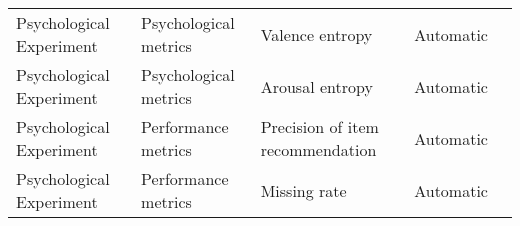 \begin{small}
\begin{center}
\begin{longtable}{@{}p{}p{}p{}p{}p{}@{}}
Psychological Experiment & Psychological metrics & Valence entropy                                                                                                                                                                                             & Automatic & \cite{lei2024fairmindsim}                                                                                                                                                                                                                                                                                                                                                                                                   \\
Psychological Experiment & Psychological metrics & Arousal entropy                                                                                                                                                                                             & Automatic & \cite{lei2024fairmindsim}                                                                                                                                                                                                                                                                                                                                                                                                   \\
Psychological Experiment & Performance metrics                 & Precision of item recommendation                                                                                                                                                                            & Automatic & \cite{Wang2023UserBS}                                                                                                                                                                                                                                                                                                                                                                                            \\
Psychological Experiment & Performance metrics                 & Missing rate                                                                                                                                                                                                & Automatic & \cite{lei2024fairmindsim}                                                                                                                                                                                                                                                                                                                                                                                                   \\

\end{longtable}
\end{center}
\end{small}
